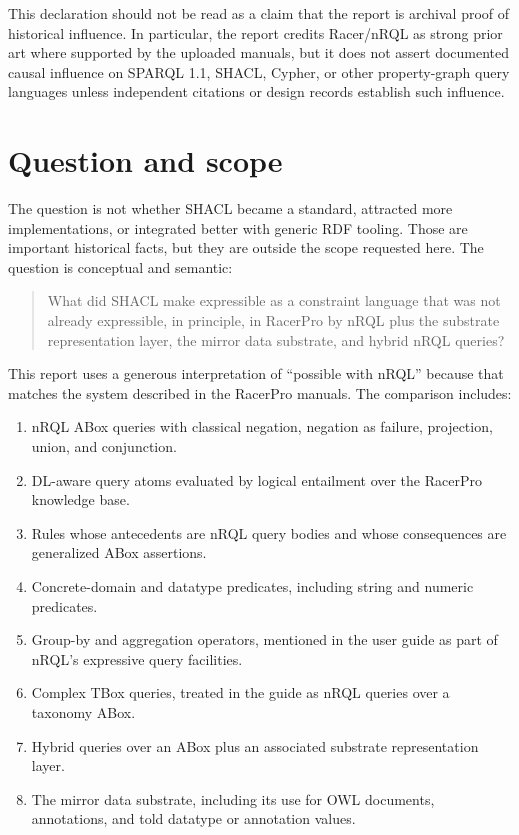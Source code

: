 \documentclass[11pt,letterpaper]{article}
\newcommand{\nrql}{nRQL}
\newcommand{\racer}{RacerPro}
\newcommand{\shacl}{SHACL}
\newcommand{\naf}{negation as failure}
\newcommand{\abox}{ABox}
\newcommand{\tbox}{TBox}
\newcommand{\owl}{OWL}
\begin{document}
This declaration should not be read as a claim that the report is archival proof of historical influence. In particular, the report credits Racer/nRQL as strong prior art where supported by the uploaded manuals, but it does not assert documented causal influence on SPARQL 1.1, SHACL, Cypher, or other property-graph query languages unless independent citations or design records establish such influence.

\tableofcontents
\newpage
{}

\section{Question and scope}

The question is not whether \shacl{} became a standard, attracted more implementations, or integrated better with generic RDF tooling. Those are important historical facts, but they are outside the scope requested here. The question is conceptual and semantic:

\begin{quote}
What did \shacl{} make expressible as a constraint language that was not already expressible, in principle, in \racer{} by \nrql{} plus the substrate representation layer, the mirror data substrate, and hybrid \nrql{} queries?
\end{quote}

This report uses a generous interpretation of ``possible with \nrql{}'' because that matches the system described in the RacerPro manuals. The comparison includes:

\begin{enumerate}[leftmargin=2em]
  \item \nrql{} \abox{} queries with classical negation, \naf{}, projection, union, and conjunction.
  \item DL-aware query atoms evaluated by logical entailment over the \racer{} knowledge base.
  \item Rules whose antecedents are \nrql{} query bodies and whose consequences are generalized \abox{} assertions.
  \item Concrete-domain and datatype predicates, including string and numeric predicates.
  \item Group-by and aggregation operators, mentioned in the user guide as part of \nrql{}'s expressive query facilities.
  \item Complex \tbox{} queries, treated in the guide as \nrql{} queries over a taxonomy \abox{}.
  \item Hybrid queries over an \abox{} plus an associated substrate representation layer.
  \item The mirror data substrate, including its use for \owl{} documents, annotations, and told datatype or annotation values.
\end{enumerate}
\end{document}

